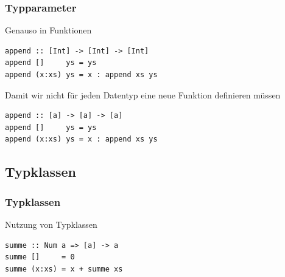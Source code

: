 \begin{frame}[fragile]
\frametitle{Typparameter}
\begin{block}{Genauso in Funktionen}
\begin{lstlisting}
append :: [Int] -> [Int] -> [Int]
append []     ys = ys
append (x:xs) ys = x : append xs ys
\end{lstlisting}
\end{block}
\pause
\begin{block}{Damit wir nicht für jeden Datentyp eine neue Funktion definieren müssen}
\begin{lstlisting}
append :: [a] -> [a] -> [a]
append []     ys = ys
append (x:xs) ys = x : append xs ys
\end{lstlisting}
\end{block}
\end{frame}
\subsection{Typklassen}


\begin{frame}[fragile]
\frametitle{Typklassen}
\begin{block}{Nutzung von Typklassen}
\begin{lstlisting}
summe :: Num a => [a] -> a
summe []     = 0
summe (x:xs) = x + summe xs
\end{lstlisting}
\end{block}
\end{frame}

